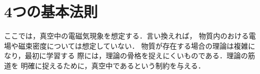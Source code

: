    \section{4つの基本法則}\label{sec:4fundlaw}
    \begin{mycomment}
        ここでは，真空中の電磁気現象を想定する．言い換えれば，
        物質内のおける電場や磁束密度については想定していない．
        物質が存在する場合の理論は複雑になり，最初に学習する
        際には，理論の骨格を捉えにくいものである．理論の筋道を
        明確に捉えるために，真空中であるという制約を与える．
    \end{mycomment}

